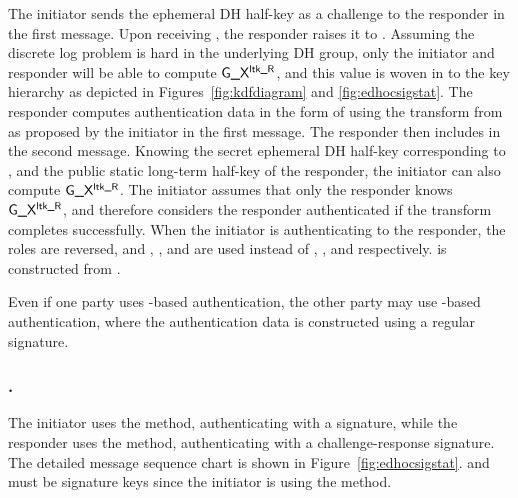 The initiator sends the ephemeral DH half-key \mGx{} as a challenge to the
responder in the first message.
%
%
Upon receiving \mGx{}, the responder raises it to \mLtkr{}.
%
Assuming the discrete log problem is hard in the underlying DH group,
only the initiator and responder will be able to compute $\textsf{G\_X}{}^{\textsf{ltk\_R}}{}$,
and this value is woven in to the key hierarchy as depicted in
Figures~\ref{fig:kdfdiagram} and \ref{fig:edhocsigstat}.
%
The responder computes authentication data \mAuthr{} in the form of \mMactwo{} using the \mAead{} transform from \mSuites{} as proposed by the
initiator in the first message.
%
The responder then includes \mMactwo{} in the second message.
%
Knowing the secret ephemeral DH half-key corresponding to \mGx{}, and the public
static long-term half-key of the responder, the initiator can also
compute $\textsf{G\_X}{}^{\textsf{ltk\_R}}{}$.
%
The initiator assumes that only the responder knows $\textsf{G\_X}{}^{\textsf{ltk\_R}}{}$, and
therefore considers the responder authenticated if the \mAead{} transform
completes successfully.
%
When the initiator is authenticating to the responder, the roles are reversed,
and \mGy, \mLtki, and \mAuthi{} are used instead of \mGx, \mLtkr, and \mAuthr{} respectively. 
\mAuthi{} is constructed from \mMacthree{}.
%

Even if one party uses \mStat{}-based authentication, the
other party may use \mSig{}-based authentication, where the authentication data is constructed
using a regular signature.
%
%

\spacehack
\subsubsection{\mSigStat.}
The initiator uses the \mSig{} method, authenticating with a signature,
while the responder uses the \mStat{} method, authenticating with a
challenge-response signature.
%
The detailed message sequence chart is shown in Figure~\ref{fig:edhocsigstat}.
%
\mCredi{} and \mLtki{} must be signature keys since the initiator is using the
\mSig{} method.
%

